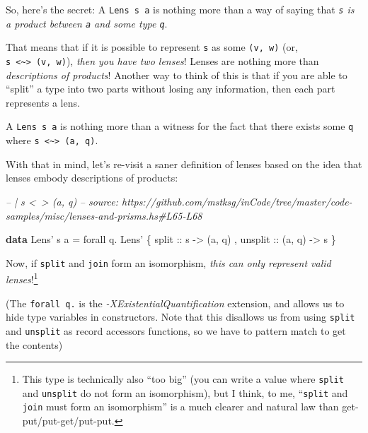 \documentclass[]{article}
\newenvironment{Shaded}{}{}
\newcommand{\CommentTok}[1]{\textcolor[rgb]{0.38,0.63,0.69}{\textit{#1}}}
\newcommand{\DataTypeTok}[1]{\textcolor[rgb]{0.56,0.13,0.00}{#1}}
\newcommand{\FunctionTok}[1]{\textcolor[rgb]{0.02,0.16,0.49}{#1}}
\newcommand{\KeywordTok}[1]{\textcolor[rgb]{0.00,0.44,0.13}{\textbf{#1}}}
\newcommand{\NormalTok}[1]{#1}
\newcommand{\OtherTok}[1]{\textcolor[rgb]{0.00,0.44,0.13}{#1}}
\begin{document}
So, here's the secret: A \texttt{Lens\textquotesingle{}\ s\ a} is nothing more
than a way of saying that \emph{\texttt{s} is a product between \texttt{a} and
some type \texttt{q}}.

That means that if it is possible to represent \texttt{s} as some
\texttt{(v,\ w)} (or,
\texttt{s\ \textless{}\textasciitilde{}\textgreater{}\ (v,\ w)}), \emph{then you
have two lenses}! Lenses are nothing more than \emph{descriptions of products}!
Another way to think of this is that if you are able to ``split'' a type into
two parts without losing any information, then each part represents a lens.

A \texttt{Lens\textquotesingle{}\ s\ a} is nothing more than a witness for the
fact that there exists some \texttt{q} where
\texttt{s\ \textless{}\textasciitilde{}\textgreater{}\ (a,\ q)}.

With that in mind, let's re-visit a saner definition of lenses based on the idea
that lenses embody descriptions of products:

\begin{Shaded}
\begin{Highlighting}[]
\CommentTok{-- | s <~> (a, q)}
\CommentTok{-- source: https://github.com/mstksg/inCode/tree/master/code-samples/misc/lenses-and-prisms.hs#L65-L68}

\KeywordTok{data} \DataTypeTok{Lens'}\NormalTok{ s a }\FunctionTok{=}\NormalTok{ forall q}\FunctionTok{.} \DataTypeTok{Lens'}
\NormalTok{    \{}\OtherTok{ split   ::}\NormalTok{ s }\OtherTok{->}\NormalTok{ (a, q)}
\NormalTok{    ,}\OtherTok{ unsplit ::}\NormalTok{ (a, q) }\OtherTok{->}\NormalTok{ s}
\NormalTok{    \}}
\end{Highlighting}
\end{Shaded}

Now, if \texttt{split} and \texttt{join} form an isomorphism, \emph{this can
only represent valid lenses}!\footnote{This type is technically also ``too big''
  (you can write a value where \texttt{split} and \texttt{unsplit} do not form
  an isomorphism), but I think, to me, ``\texttt{split} and \texttt{join} must
  form an isomorphism'' is a much clearer and natural law than
  get-put/put-get/put-put.}

(The \texttt{forall\ q.} is the \emph{-XExistentialQuantification} extension,
and allows us to hide type variables in constructors. Note that this disallows
us from using \texttt{split} and \texttt{unsplit} as record accessors functions,
so we have to pattern match to get the contents)
\end{document}
